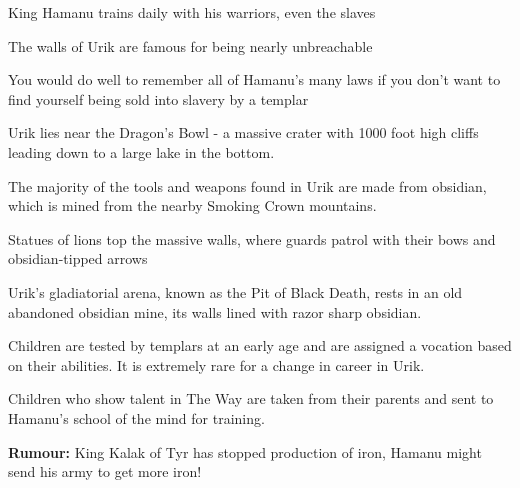 \begin{description}
    \item King Hamanu trains daily with his warriors, even the slaves
    \item The walls of Urik are famous for being nearly unbreachable
    \item You would do well to remember all of Hamanu’s many laws if you don’t want to find yourself being sold into slavery by a templar
    \item Urik lies near the Dragon’s Bowl - a massive crater with 1000 foot high cliffs leading down to a large lake in the bottom.
    \item The majority of the tools and weapons found in Urik are made from obsidian, which is mined from the nearby Smoking Crown mountains.
    \item Statues of lions top the massive walls, where guards patrol with their bows and obsidian-tipped arrows
    \item Urik’s gladiatorial arena, known as the Pit of Black Death, rests in an old abandoned obsidian mine, its walls lined with razor sharp obsidian.
    \item Children are tested by templars at an early age and are assigned a vocation based on their abilities. It is extremely rare for a change in career in Urik.
    \item Children who show talent in The Way are taken from their parents and sent to Hamanu’s school of the mind for training.
    \item \textbf{Rumour:} King Kalak of Tyr has stopped production of iron, Hamanu might send his army to get more iron!
\end{description}
